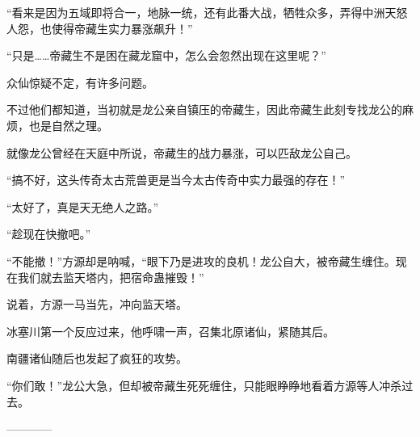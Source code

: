 \begin{this_body}
“看来是因为五域即将合一，地脉一统，还有此番大战，牺牲众多，弄得中洲天怒人怨，也使得帝藏生实力暴涨飙升！”

“只是……帝藏生不是困在藏龙窟中，怎么会忽然出现在这里呢？”

众仙惊疑不定，有许多问题。

不过他们都知道，当初就是龙公亲自镇压的帝藏生，因此帝藏生此刻专找龙公的麻烦，也是自然之理。

就像龙公曾经在天庭中所说，帝藏生的战力暴涨，可以匹敌龙公自己。

“搞不好，这头传奇太古荒兽更是当今太古传奇中实力最强的存在！”

“太好了，真是天无绝人之路。”

“趁现在快撤吧。”

“不能撤！”方源却是呐喊，“眼下乃是进攻的良机！龙公自大，被帝藏生缠住。现在我们就去监天塔内，把宿命蛊摧毁！”

说着，方源一马当先，冲向监天塔。

冰塞川第一个反应过来，他呼啸一声，召集北原诸仙，紧随其后。

南疆诸仙随后也发起了疯狂的攻势。

“你们敢！”龙公大急，但却被帝藏生死死缠住，只能眼睁睁地看着方源等人冲杀过去。

------------

\end{this_body}

